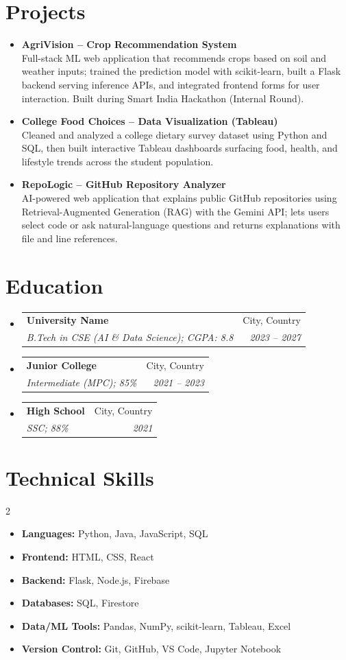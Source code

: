 \documentclass[letterpaper,11pt]{article}
\makeatletter
\newcommand{\resumeSubheading}[4]{
  \item[]
    \begin{tabular*}{0.97\textwidth}{l@{\extracolsep{\fill}}r}
      \textbf{#1} & #2 \\[-2pt]
      \textit{\small#3} & \textit{\small #4} \\
    \end{tabular*}\vspace{0pt}
}
\newcommand{\resumeProjectItem}[2]{
  \item\small{
    \textbf{#1}\\[2pt]
    #2}
}
\newcommand{\resumeSubHeadingListStart}{\begin{itemize}[leftmargin=*, itemsep=4pt, parsep=0pt, topsep=1pt]}
\newcommand{\resumeSubHeadingListEnd}{\end{itemize}}
\newenvironment{bulletcol}{
  \begin{itemize}[leftmargin=14pt, label={\color{bulletblue}\textbullet}, itemsep=2pt, topsep=1pt, parsep=0pt]
}{
  \end{itemize}
}
\makeatother
\begin{document}
\section{Projects}
\resumeSubHeadingListStart
  \resumeProjectItem{AgriVision -- Crop Recommendation System}
    {Full-stack ML web application that recommends crops based on soil and weather inputs; trained the prediction model with scikit-learn, built a Flask backend serving inference APIs, and integrated frontend forms for user interaction. Built during Smart India Hackathon (Internal Round).}
  \resumeProjectItem{College Food Choices -- Data Visualization (Tableau)}
    {Cleaned and analyzed a college dietary survey dataset using Python and SQL, then built interactive Tableau dashboards surfacing food, health, and lifestyle trends across the student population.}
  \resumeProjectItem{RepoLogic -- GitHub Repository Analyzer}
    {AI-powered web application that explains public GitHub repositories using Retrieval-Augmented Generation (RAG) with the Gemini API; lets users select code or ask natural-language questions and returns explanations with file and line references.}
\resumeSubHeadingListEnd

\section{Education}
\begin{itemize}[leftmargin=*, itemsep=2pt, parsep=0pt, topsep=1pt]
  \resumeSubheading
    {University Name}{City, Country}
    {B.Tech in CSE (AI \& Data Science); CGPA: 8.8}{2023 -- 2027}
  \resumeSubheading
    {Junior College}{City, Country}
    {Intermediate (MPC); 85\%}{2021 -- 2023}
  \resumeSubheading
    {High School}{City, Country}
    {SSC; 88\%}{2021}
\end{itemize}

\section{Technical Skills}
\begin{multicols}{2}
\begin{bulletcol}
\small
\item \textbf{Languages:} Python, Java, JavaScript, SQL
\item \textbf{Frontend:} HTML, CSS, React
\item \textbf{Backend:} Flask, Node.js, Firebase
\item \textbf{Databases:} SQL, Firestore
\item \textbf{Data/ML Tools:} Pandas, NumPy, scikit-learn, Tableau, Excel
\item \textbf{Version Control:} Git, GitHub, VS Code, Jupyter Notebook
\end{bulletcol}
\end{multicols}
\end{document}
